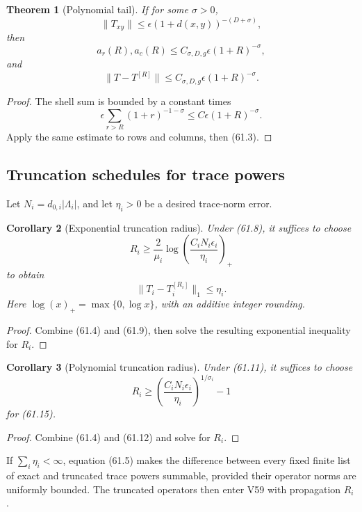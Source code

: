 \documentclass[11pt]{article}
\newtheorem{theorem}{Theorem}[section]
\newtheorem{corollary}[theorem]{Corollary}
\begin{document}
\begin{theorem}[Polynomial tail]
\label{thm:v11v61-polynomial}
If for some \(\sigma>0\),
\[
                         \lVert T_{xy}\rVert
           \le\epsilon(1+d(x,y))^{-(D+\sigma)},               \tag{61.11}
\]
then
\[
 a_r(R),a_c(R)\le C_{\sigma,D,g}\epsilon(1+R)^{-\sigma},      \tag{61.12}
\]
and
\[
 \lVert T-T^{[R]}\rVert
          \le C_{\sigma,D,g}\epsilon(1+R)^{-\sigma}.          \tag{61.13}
\]
\end{theorem}

\begin{proof}
The shell sum is bounded by a constant times
\[
 \epsilon\sum_{r>R}(1+r)^{-1-\sigma}
 \le C\epsilon(1+R)^{-\sigma}.
\]
Apply the same estimate to rows and columns, then (61.3).
\end{proof}

\subsection{Truncation schedules for trace powers}

Let \(N_i=d_{0,i}|\Lambda_i|\), and let \(\eta_i>0\) be a desired
trace-norm error.

\begin{corollary}[Exponential truncation radius]
\label{cor:v11v61-exp-radius}
Under (61.8), it suffices to choose
\[
 R_i\ge\frac2{\mu_i}
   \log\left(\frac{C_iN_i\epsilon_i}{\eta_i}\right)_+         \tag{61.14}
\]
to obtain
\[
                    \lVert T_i-T_i^{[R_i]}\rVert_1\le\eta_i. \tag{61.15}
\]
Here \(\log(x)_+=\max\{0,\log x\}\), with an additive integer rounding.
\end{corollary}

\begin{proof}
Combine (61.4) and (61.9), then solve the resulting exponential
inequality for \(R_i\).
\end{proof}

\begin{corollary}[Polynomial truncation radius]
\label{cor:v11v61-poly-radius}
Under (61.11), it suffices to choose
\[
 R_i\ge
 \left(\frac{C_iN_i\epsilon_i}{\eta_i}\right)^{1/\sigma_i}-1 \tag{61.16}
\]
for (61.15).
\end{corollary}

\begin{proof}
Combine (61.4) and (61.12) and solve for \(R_i\).
\end{proof}

If \(\sum_i\eta_i<\infty\), equation (61.5) makes the difference
between every fixed finite list of exact and truncated trace powers
summable, provided their operator norms are uniformly bounded.
The truncated operators then enter V59 with propagation \(R_i\).
\end{document}
